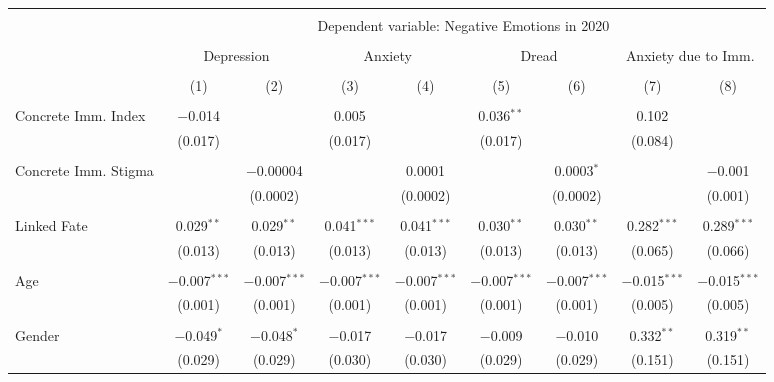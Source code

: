 
\begin{table}[!htbp] \centering 
  \caption{} 
  \label{} 
\begin{tabular}{@{\extracolsep{5pt}}lcccccccc} 
\\[-1.8ex]\hline 
\hline \\[-1.8ex] 
 & \multicolumn{8}{c}{Dependent variable: Negative Emotions in 2020} \\ 
\cline{2-9} 
\\[-1.8ex] & \multicolumn{2}{c}{Depression} & \multicolumn{2}{c}{Anxiety} & \multicolumn{2}{c}{Dread} & \multicolumn{2}{c}{Anxiety due to Imm.} \\ 
\\[-1.8ex] & (1) & (2) & (3) & (4) & (5) & (6) & (7) & (8)\\ 
\hline \\[-1.8ex] 
 Concrete Imm. Index & $-$0.014 &  & 0.005 &  & 0.036$^{**}$ &  & 0.102 &  \\ 
  & (0.017) &  & (0.017) &  & (0.017) &  & (0.084) &  \\ 
  & & & & & & & & \\ 
 Concrete Imm. Stigma &  & $-$0.00004 &  & 0.0001 &  & 0.0003$^{*}$ &  & $-$0.001 \\ 
  &  & (0.0002) &  & (0.0002) &  & (0.0002) &  & (0.001) \\ 
  & & & & & & & & \\ 
 Linked Fate & 0.029$^{**}$ & 0.029$^{**}$ & 0.041$^{***}$ & 0.041$^{***}$ & 0.030$^{**}$ & 0.030$^{**}$ & 0.282$^{***}$ & 0.289$^{***}$ \\ 
  & (0.013) & (0.013) & (0.013) & (0.013) & (0.013) & (0.013) & (0.065) & (0.066) \\ 
  & & & & & & & & \\ 
 Age & $-$0.007$^{***}$ & $-$0.007$^{***}$ & $-$0.007$^{***}$ & $-$0.007$^{***}$ & $-$0.007$^{***}$ & $-$0.007$^{***}$ & $-$0.015$^{***}$ & $-$0.015$^{***}$ \\ 
  & (0.001) & (0.001) & (0.001) & (0.001) & (0.001) & (0.001) & (0.005) & (0.005) \\ 
  & & & & & & & & \\ 
 Gender & $-$0.049$^{*}$ & $-$0.048$^{*}$ & $-$0.017 & $-$0.017 & $-$0.009 & $-$0.010 & 0.332$^{**}$ & 0.319$^{**}$ \\ 
  & (0.029) & (0.029) & (0.030) & (0.030) & (0.029) & (0.029) & (0.151) & (0.151) \\ 

\end{tabular}
\end{table}
